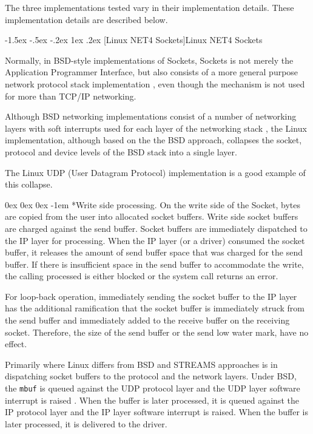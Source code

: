 \documentclass[letterpaper,final,notitlepage,twocolumn,10pt,twoside]{article}
\makeatletter
\let\normalsize\small
\let\small\footnotesize
\let\footnotesize\scriptsize
\let\scriptsize\tiny
\renewcommand\subsection{\@startsection{subsection}{2}{\z@}%
                                     {-1.5ex \@plus -.5ex \@minus -.2ex}%
                                     {1ex \@plus .2ex}%
                                     {\normalfont\normalsize\bfseries}}
\renewcommand\subparagraph{\@startsection{subparagraph}{5}{\parindent}%
                                       {0ex \@plus 0ex \@minus 0ex}%
                                       {-1em}%
                                      {\normalfont\normalsize\bfseries\slshape}}
\makeatother
\begin{document}
The three implementations tested vary in their implementation details.  These
implementation details are described below.

\subsection[Linux NET4 Sockets]{Linux NET4 Sockets}

Normally, in BSD-style implementations of Sockets, Sockets is not merely the
Application Programmer Interface, but also consists of a more general purpose
network protocol stack implementation \cite[]{bsd}, even though the mechanism
is not used for more than TCP/IP networking.  \cite[]{magic}

Although BSD networking implementations consist of a number of networking
layers with soft interrupts used for each layer of the networking stack
\cite[]{bsd}, the Linux implementation, although based on the the BSD
approach, collapses the socket, protocol and device levels of the BSD stack
into a single layer.

The Linux UDP (User Datagram Protocol) implementation is a good example of
this collapse.

\subparagraph*{Write side processing.} On the write side of the Socket, bytes
are copied from the user into allocated socket buffers.  Write side socket
buffers are charged against the send buffer.  Socket buffers are immediately
dispatched to the IP layer for processing.  When the IP layer (or a driver)
consumed the socket buffer, it releases the amount of send buffer space that
was charged for the send buffer.  If there is insufficient space in the send
buffer to accommodate the write, the calling processed is either blocked or
the system call returns an error.

For loop-back operation, immediately sending the socket buffer to the IP layer
has the additional ramification that the socket buffer is immediately struck
from the send buffer and immediately added to the receive buffer on the
receiving socket.  Therefore, the size of the send buffer or the send low
water mark, have no effect.

Primarily where Linux differs from BSD and STREAMS approaches is in
dispatching socket buffers to the protocol and the network layers.  Under BSD,
the \texttt{mbuf} is queued against the UDP protocol layer and the UDP layer
software interrupt is raised \cite[]{bsd}.  When the buffer is later
processed, it is queued against the IP protocol layer and the IP layer
software interrupt is raised.  When the buffer is later processed, it is
delivered to the driver.
\end{document}
